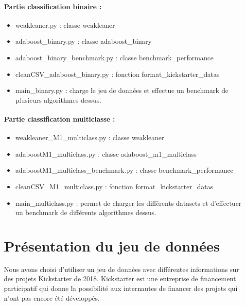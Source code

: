\documentclass{article}
\begin{document}
\paragraph{Partie classification binaire : }
\begin{itemize}
  \item weakleaner.py : classe weakleaner
  \item adaboost\_binary.py : classe adaboost\_binary
  \item adaboost\_binary\_benchmark.py : classe benchmark\_performance
  \item cleanCSV\_adaboost\_binary.py : fonction format\_kickstarter\_datas
  \item main\_binary.py : charge le jeu de données et effectue un benchmark de plusieurs algorithmes dessus.
\end{itemize}

\paragraph{Partie classification multiclasse : }


\begin{itemize}
  \item weakleaner\_M1\_multiclass.py : classe weakleaner
  \item adaboostM1\_multiclass.py : classe adaboost\_m1\_multiclass
  \item adaboostM1\_multiclass\_benchmark.py : classe benchmark\_performance
  \item cleanCSV\_M1\_multiclass.py : fonction format\_kickstarter\_datas
  \item main\_multiclass.py : permet de charger les différents datasets et d'effectuer un benchmark de différents algorithmes dessus. 
\end{itemize}


\section{Présentation du jeu de données}

Nous avons choisi d'utiliser un jeu de données avec différentes informations sur des projets Kickstarter de 2018. Kickstarter est une entreprise de financement participatif qui donne la possibilité aux internautes de financer des projets qui n'ont pas encore été développés.\newline 
\end{document}

